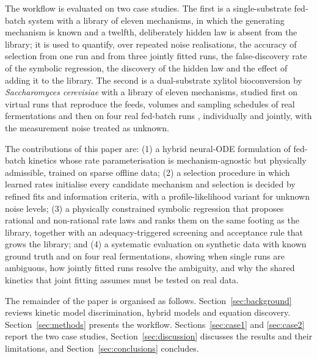 The workflow is evaluated on two case studies. The first is a single-substrate fed-batch system with a library of eleven mechanisms, in which the generating mechanism is known and a twelfth, deliberately hidden law is absent from the library; it is used to quantify, over repeated noise realisations, the accuracy of selection from one run and from three jointly fitted runs, the false-discovery rate of the symbolic regression, the discovery of the hidden law and the effect of adding it to the library. The second is a dual-substrate xylitol bioconversion by \emph{Saccharomyces cerevisiae} with a library of eleven mechanisms, studied first on virtual runs that reproduce the feeds, volumes and sampling schedules of real fermentations and then on four real fed-batch runs \citep{Toivari2025}, individually and jointly, with the measurement noise treated as unknown.

The contributions of this paper are: (1) a hybrid neural-ODE formulation of fed-batch kinetics whose rate parameterisation is mechanism-agnostic but physically admissible, trained on sparse offline data; (2) a selection procedure in which learned rates initialise every candidate mechanism and selection is decided by refined fits and information criteria, with a profile-likelihood variant for unknown noise levels; (3) a physically constrained symbolic regression that proposes rational and non-rational rate laws and ranks them on the same footing as the library, together with an adequacy-triggered screening and acceptance rule that grows the library; and (4) a systematic evaluation on synthetic data with known ground truth and on four real fermentations, showing when single runs are ambiguous, how jointly fitted runs resolve the ambiguity, and why the shared kinetics that joint fitting assumes must be tested on real data.

The remainder of the paper is organised as follows. Section~\ref{sec:background} reviews kinetic model discrimination, hybrid models and equation discovery. Section~\ref{sec:methods} presents the workflow. Sections~\ref{sec:case1} and \ref{sec:case2} report the two case studies, Section~\ref{sec:discussion} discusses the results and their limitations, and Section~\ref{sec:conclusions} concludes.
